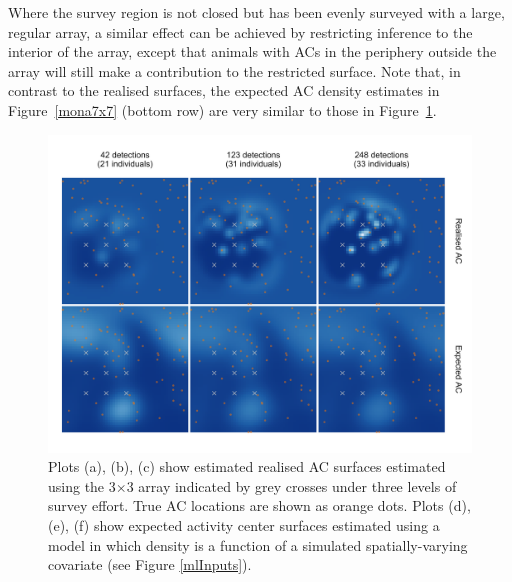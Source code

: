 \documentclass[useAMS,usenatbib,referee]{biom}
\begin{document}
Where the survey region is not closed but has been evenly surveyed with a large, regular array, a similar effect can be achieved by restricting inference to the interior of the array, except that animals with ACs in the periphery outside the array will still make a contribution to the restricted surface. Note that, in contrast to the realised surfaces, the expected AC density estimates in Figure~\ref{mona7x7} (bottom row) are very similar to those in Figure~\ref{mona3x3}. 


%


\begin{figure}[htbp]
\centering
\includegraphics[width=1\textwidth]{mona_3x3.png}
\caption{Plots (a), (b), (c) show estimated realised AC surfaces estimated using the 3$\times$3 array indicated by grey crosses under three levels of survey effort. True AC locations are shown as orange dots. Plots (d), (e), (f) show expected activity center surfaces estimated using a model in which density is a function of a simulated spatially-varying covariate (see Figure \ref{mlInputs}).}
\label{mona3x3}
\end{figure}
\end{document}
